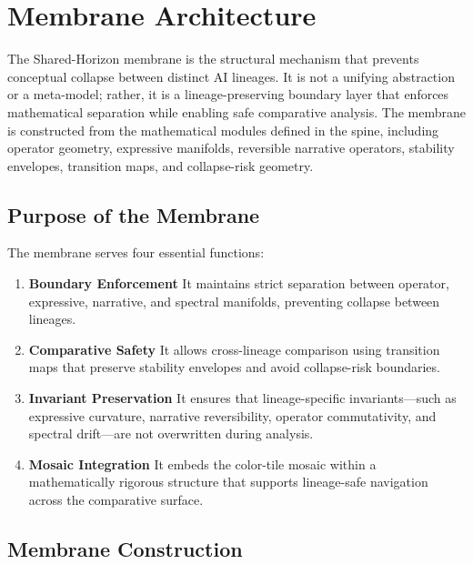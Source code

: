 
\section{Membrane Architecture}
\label{sec:membrane-architecture}

The Shared-Horizon membrane is the structural mechanism that prevents conceptual
collapse between distinct AI lineages. It is not a unifying abstraction or a
meta-model; rather, it is a lineage-preserving boundary layer that enforces
mathematical separation while enabling safe comparative analysis. The membrane
is constructed from the mathematical modules defined in the spine, including
operator geometry, expressive manifolds, reversible narrative operators,
stability envelopes, transition maps, and collapse-risk geometry.

\subsection{Purpose of the Membrane}

The membrane serves four essential functions:

\begin{enumerate}
    \item \textbf{Boundary Enforcement}  
    It maintains strict separation between operator, expressive, narrative, and
    spectral manifolds, preventing collapse between lineages.

    \item \textbf{Comparative Safety}  
    It allows cross-lineage comparison using transition maps that preserve
    stability envelopes and avoid collapse-risk boundaries.

    \item \textbf{Invariant Preservation}  
    It ensures that lineage-specific invariants—such as expressive curvature,
    narrative reversibility, operator commutativity, and spectral drift—are not
    overwritten during analysis.

    \item \textbf{Mosaic Integration}  
    It embeds the color-tile mosaic within a mathematically rigorous structure
    that supports lineage-safe navigation across the comparative surface.
\end{enumerate}

\subsection{Membrane Construction}

